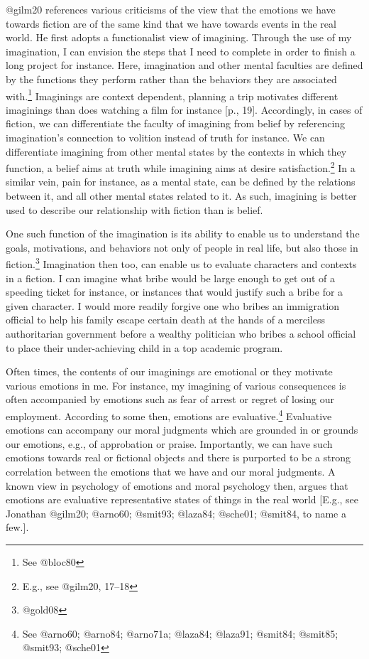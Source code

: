 \documentclass[
  letterpaper,
  DIV=11,
  numbers=noendperiod]{scrartcl}
\theoremstyle{remark}
\begin{document}
@gilm20 references various criticisms of the view that the emotions we
have towards fiction are of the same kind that we have towards events in
the real world. He first adopts a functionalist view of imagining.
Through the use of my imagination, I can envision the steps that I need
to complete in order to finish a long project for instance. Here,
imagination and other mental faculties are defined by the functions they
perform rather than the behaviors they are associated with.\footnote{See
  @bloc80} Imaginings are context dependent, planning a trip motivates
different imaginings than does watching a film for instance {[}p.,
19{]}. Accordingly, in cases of fiction, we can differentiate the
faculty of imagining from belief by referencing imagination's connection
to volition instead of truth for instance. We can differentiate
imagining from other mental states by the contexts in which they
function, a belief aims at truth while imagining aims at desire
satisfaction.\footnote{E.g., see @gilm20, 17--18} In a similar vein,
pain for instance, as a mental state, can be defined by the relations
between it, and all other mental states related to it. As such,
imagining is better used to describe our relationship with fiction than
is belief.

One such function of the imagination is its ability to enable us to
understand the goals, motivations, and behaviors not only of people in
real life, but also those in fiction.\footnote{@gold08} Imagination then
too, can enable us to evaluate characters and contexts in a fiction. I
can imagine what bribe would be large enough to get out of a speeding
ticket for instance, or instances that would justify such a bribe for a
given character. I would more readily forgive one who bribes an
immigration official to help his family escape certain death at the
hands of a merciless authoritarian government before a wealthy
politician who bribes a school official to place their under-achieving
child in a top academic program.

Often times, the contents of our imaginings are emotional or they
motivate various emotions in me. For instance, my imagining of various
consequences is often accompanied by emotions such as fear of arrest or
regret of losing our employment. According to some then, emotions are
evaluative.\footnote{See @arno60; @arno84; @arno71a; @laza84; @laza91;
  @smit84; @smit85; @smit93; @sche01} Evaluative emotions can accompany
our moral judgments which are grounded in or grounds our emotions, e.g.,
of approbation or praise. Importantly, we can have such emotions towards
real or fictional objects and there is purported to be a strong
correlation between the emotions that we have and our moral judgments. A
known view in psychology of emotions and moral psychology then, argues
that emotions are evaluative representative states of things in the real
world {[}E.g., see Jonathan @gilm20; @arno60; @smit93; @laza84; @sche01;
@smit84, to name a few.{]}.
\end{document}
